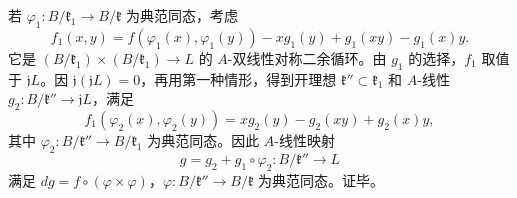 若 $\varphi_1:B/\mathfrak k_1\to B/\mathfrak k$ 为典范同态，考虑
\[
 f_1(x,y)=f(\varphi_1(x),\varphi_1(y))-xg_1(y)+g_1(xy)-g_1(x)y.
\]
它是 $(B/\mathfrak k_1)\times(B/\mathfrak k_1)\to L$ 的 $A$-双线性对称二余循环。由 $g_1$ 的选择，$f_1$ 取值于 $\mathfrak jL$。因 $\mathfrak j(\mathfrak jL)=0$，再用第一种情形，得到开理想 $\mathfrak k''\subset\mathfrak k_1$ 和 $A$-线性 $g_2:B/\mathfrak k''\to\mathfrak jL$，满足
\[
 f_1(\varphi_2(x),\varphi_2(y))=xg_2(y)-g_2(xy)+g_2(x)y,
\]
其中 $\varphi_2:B/\mathfrak k''\to B/\mathfrak k_1$ 为典范同态。因此 $A$-线性映射
\[
 g=g_2+g_1\circ\varphi_2:B/\mathfrak k''\longrightarrow L
\]
满足 $dg=f\circ(\varphi\times\varphi)$，$\varphi:B/\mathfrak k''\to B/\mathfrak k$ 为典范同态。证毕。

